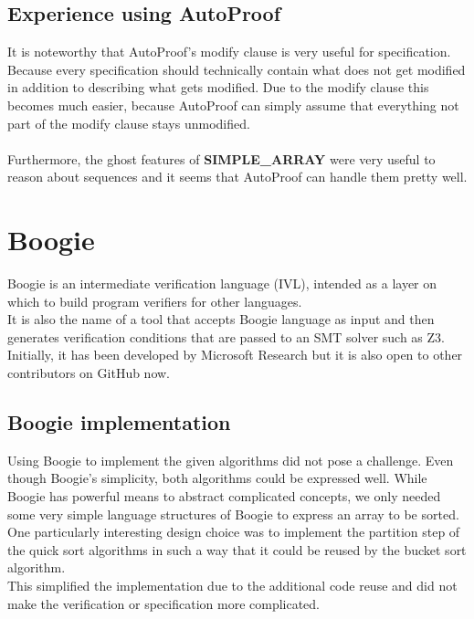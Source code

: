 \documentclass{report}
\begin{document}
\subsection{Experience using AutoProof}

It is noteworthy that AutoProof's modify clause is very useful for specification.
Because every specification should technically contain what does not get modified
in addition to describing what gets modified. Due to the modify clause this
becomes much easier, because AutoProof can simply assume that everything not part
of the modify clause stays unmodified.
\\
\\
Furthermore, the ghost features of \textbf{SIMPLE\_ARRAY} were very useful to
reason about sequences and it seems that AutoProof can handle them pretty well.

\section{Boogie}
\label{s:boogie}
Boogie is an intermediate verification language (IVL), intended as a layer on which to build program verifiers for other languages\cite{boogiegithub}.\\
It is also the name of a tool that accepts Boogie language as input and then generates verification conditions that are passed to an SMT solver such as Z3\cite{de2008z3}\cite{z3}.\\
Initially, it has been developed by Microsoft Research but it is also open to other contributors on GitHub now.

\subsection{Boogie implementation}

Using Boogie to implement the given algorithms did not pose a challenge.
Even though Boogie's simplicity, both algorithms could be expressed well.
While Boogie has powerful means to abstract complicated concepts, we only
needed some very simple language structures of Boogie to express an array to be sorted.\\
One particularly interesting design choice was to implement the partition step
of the quick sort algorithms in such a way that it could be reused by the bucket sort algorithm.\\
This simplified the implementation due to the additional code reuse and did not
make the verification or specification more complicated.
\end{document}
